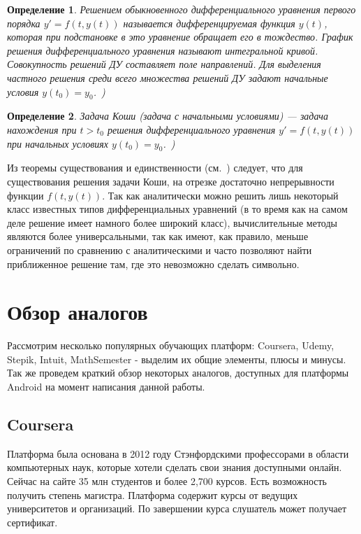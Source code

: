 \documentclass[14pt,russian]{extarticle}
\newcounter{cDefinition}
\newtheorem{Definition}{Определение}[cDefinition]
\begin{document}
\begin{Definition}
\textit{Решением} обыкновенного дифференциального уравнения первого порядка $y'=f(t, y(t)) $ называется дифференцируемая функция  $y(t)$, которая при подстановке в это уравнение обращает его в тождество. График решения дифференциального уравнения называют \textit{интегральной кривой}. Совокупность решений ДУ составляет \textit{поле направлений}. Для выделения \textit{частного решения} среди всего множества решений ДУ задают \textit{начальные условия} $y(t_0)=y_0$.~\cite[cc.~411-412]{cite:Amosov})
\end{Definition}

\begin{Definition}\label{def:Cauchy}
\textit{Задача Коши} (задача с начальными условиями) --- задача нахождения при $t > t_0$ решения дифференциального уравнения $y'=f(t, y(t)) $ при начальных условиях $y(t_0)=y_0$.~\mbox{\cite[c.~412]{cite:Amosov})}
\end{Definition}

Из теоремы существования и единственности (см.~\cite[c.~29]{cite:Filippov}) следует, что для существования решения задачи Коши, на отрезке достаточно непрерывности функции $f(t, y(t))$. Так как аналитически можно решить лишь некоторый класс известных типов дифференциальных уравнений (в то время как на самом деле решение имеет намного более широкий класс), вычислительные методы являются более универсальными, так как имеют, как правило, меньше ограничений по сравнению с аналитическими и часто позволяют найти приближенное решение там, где это невозможно сделать символьно.

\section{Обзор аналогов}
Рассмотрим несколько популярных обучающих платформ: Coursera, Udemy, Stepik, Intuit, MathSemester - выделим их общие элементы, плюсы и минусы. Так же проведем краткий обзор некоторых аналогов, доступных для платформы Android на момент написания данной работы.

\subsection{Coursera}

Платформа была основана в 2012 году Стэнфордскими профессорами в области компьютерных наук, которые хотели сделать свои знания доступными онлайн. Сейчас на сайте 35 млн студентов и более 2,700 курсов. Есть возможность получить степень магистра. Платформа содержит курсы от ведущих университетов и организаций. По завершении курса слушатель может получает сертификат.~\cite{cite:Coursera_about}
\end{document}
